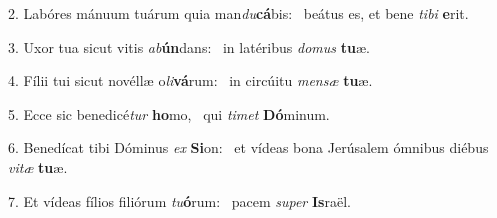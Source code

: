 2. Labóres mánuum tuárum quia man\textit{du}\textbf{cá}bis: \ast\  beátus es, et bene \textit{ti}\textit{bi} \textbf{e}rit.\

3. Uxor tua sicut vitis \textit{ab}\textbf{ún}dans: \ast\  in latéribus \textit{do}\textit{mus} \textbf{tu}æ.\

4. Fílii tui sicut novéllæ o\textit{li}\textbf{vá}rum: \ast\  in circúitu \textit{men}\textit{sæ} \textbf{tu}æ.\

5. Ecce sic benedicé\textit{tur} \textbf{ho}mo, \ast\  qui \textit{ti}\textit{met} \textbf{Dó}minum.\

6. Benedícat tibi Dóminus \textit{ex} \textbf{Si}on: \ast\  et vídeas bona Jerúsalem ómnibus diébus \textit{vi}\textit{tæ} \textbf{tu}æ.\

7. Et vídeas fílios filiórum \textit{tu}\textbf{ó}rum: \ast\  pacem \textit{su}\textit{per} \textbf{Is}raël.\


